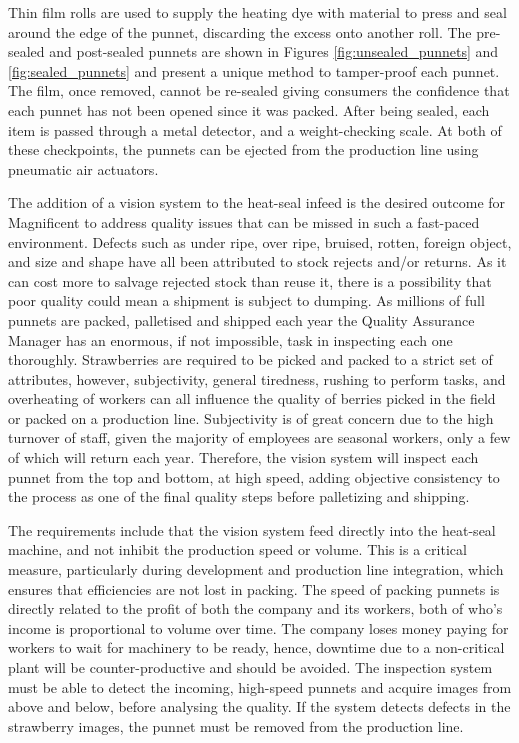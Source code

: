 \documentclass[fleqn,twoside,12pt]{report}
\begin{document}
Thin film rolls are used to supply the heating dye with material to press and seal around the edge of the punnet, discarding the excess onto another roll. The pre-sealed and post-sealed punnets are shown in Figures \ref{fig:unsealed_punnets} and \ref{fig:sealed_punnets} and present a unique method to tamper-proof each punnet. The film, once removed, cannot be re-sealed giving consumers the confidence that each punnet has not been opened since it was packed. After being sealed, each item is passed through a metal detector, and a weight-checking scale. At both of these checkpoints, the punnets can be ejected from the production line using pneumatic air actuators.

The addition of a vision system to the heat-seal infeed is the desired outcome for Magnificent to address quality issues that can be missed in such a fast-paced environment. Defects such as under ripe, over ripe, bruised, rotten, foreign object, and size and shape have all been attributed to stock rejects and/or returns. As it can cost more to salvage rejected stock than reuse it, there is a possibility that poor quality could mean a shipment is subject to dumping. As millions of full punnets are packed, palletised and shipped each year the Quality Assurance Manager has an enormous, if not impossible, task in inspecting each one thoroughly. Strawberries are required to be picked and packed to a strict set of attributes, however, subjectivity, general tiredness, rushing to perform tasks, and overheating of workers can all influence the quality of berries picked in the field or packed on a production line. Subjectivity is of great concern due to the high turnover of staff, given the majority of employees are seasonal workers, only a few of which will return each year. Therefore, the vision system will inspect each punnet from the top and bottom, at high speed, adding objective consistency to the process as one of the final quality steps before palletizing and shipping.


The requirements include that the vision system feed directly into the heat-seal machine, and not inhibit the production speed or volume. This is a critical measure, particularly during development and production line integration, which ensures that efficiencies are not lost in packing. The speed of packing punnets is directly related to the profit of both the company and its workers, both of who's income is proportional to volume over time. The company loses money paying for workers to wait for machinery to be ready, hence, downtime due to a non-critical plant will be counter-productive and should be avoided. The inspection system must be able to detect the incoming, high-speed punnets and acquire images from above and below, before analysing the quality. If the system detects defects in the strawberry images, the punnet must be removed from the production line. 
\end{document}
